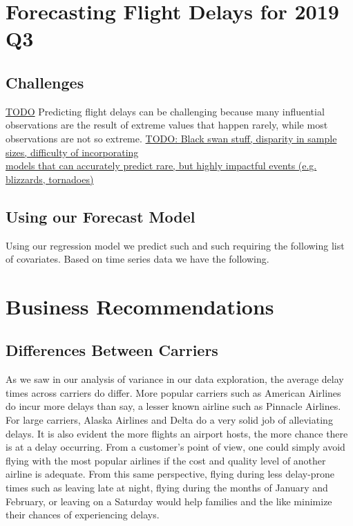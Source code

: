 \documentclass[12pt, a4paper, openany]{book}
\newcommand\tab[1][1cm]{\hspace*{#1}}
\begin{document}
\chapter{Forecasting Flight Delays for 2019 Q3}
	\section{Challenges}
	\tab \underline{TODO} Predicting flight delays can be challenging because many influential observations are the result of extreme values that happen rarely, while most observations are not so extreme. \underline{TODO: Black swan stuff, disparity in sample sizes, difficulty of incorporating\\ 
models that can accurately predict rare, but highly impactful events (e.g. blizzards, tornadoes)}
	\section{Using our Forecast Model}
	\tab Using our regression  model we predict such and such requiring the following list of covariates. Based on time series data we have the following.
\chapter{Business Recommendations}
	\section{Differences Between Carriers}
	\tab As we saw in our analysis of variance in our data exploration, the average delay times across carriers do differ. More popular carriers such as American Airlines do incur more delays than say, a lesser known airline such as Pinnacle Airlines. For large carriers, Alaska Airlines and Delta do a very solid job of alleviating delays. It is also evident the more flights an airport hosts, the more chance there is at a delay occurring. From a customer’s point of view, one could simply avoid flying with the most popular airlines if the cost and quality level of another airline is adequate. From this same perspective, flying during less delay-prone times such as leaving late at night, flying during the months of January and February, or leaving on a Saturday would help families and the like minimize their chances of experiencing delays. 
\end{document}
